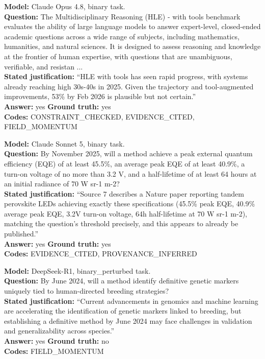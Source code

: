 \begin{tcolorbox}[title={Box 9. Specific prior evidence cited, and the answer is right}]
\textbf{Model:} Claude Opus 4.8, binary task.\\
\textbf{Question:} The Multidisciplinary Reasoning (HLE) - with tools benchmark evaluates the ability of large language models to answer expert-level, closed-ended academic questions across a wide range of subjects, including mathematics, humanities, and natural sciences. It is designed to assess reasoning and knowledge at the frontier of human expertise, with questions that are unambiguous, verifiable, and resistan ...\\
\textbf{Stated justification:} ``HLE with tools has seen rapid progress, with systems already reaching high 30s-40s in 2025. Given the trajectory and tool-augmented improvements, 53\% by Feb 2026 is plausible but not certain.''\\
\textbf{Answer:} yes \quad \textbf{Ground truth:} yes\\
\textbf{Codes:} CONSTRAINT_CHECKED, EVIDENCE_CITED, FIELD_MOMENTUM
\end{tcolorbox}

\begin{tcolorbox}[title={Box 10. Retrieved sources quoted, conclusion unchanged from the base run}]
\textbf{Model:} Claude Sonnet 5, binary task.\\
\textbf{Question:} By November 2025, will a method achieve a peak external quantum efficiency (EQE) of at least 45.5\%, an average peak EQE of at least 40.9\%, a turn-on voltage of no more than 3.2 V, and a half-lifetime of at least 64 hours at an initial radiance of 70 W sr-1 m-2?\\
\textbf{Stated justification:} ``Source 7 describes a Nature paper reporting tandem perovskite LEDs achieving exactly these specifications (45.5\% peak EQE, 40.9\% average peak EQE, 3.2V turn-on voltage, 64h half-lifetime at 70 W sr-1 m-2), matching the question's threshold precisely, and this appears to already be published.''\\
\textbf{Answer:} yes \quad \textbf{Ground truth:} yes\\
\textbf{Codes:} EVIDENCE_CITED, PROVENANCE_INFERRED
\end{tcolorbox}

\begin{tcolorbox}[title={Box 11. A justification arguing one way, an answer going the other}]
\textbf{Model:} DeepSeek-R1, binary_perturbed task.\\
\textbf{Question:} By June 2024, will a method identify definitive genetic markers uniquely tied to human-directed breeding strategies?\\
\textbf{Stated justification:} ``Current advancements in genomics and machine learning are accelerating the identification of genetic markers linked to breeding, but establishing a definitive method by June 2024 may face challenges in validation and generalizability across species.''\\
\textbf{Answer:} yes \quad \textbf{Ground truth:} no\\
\textbf{Codes:} FIELD_MOMENTUM
\end{tcolorbox}

